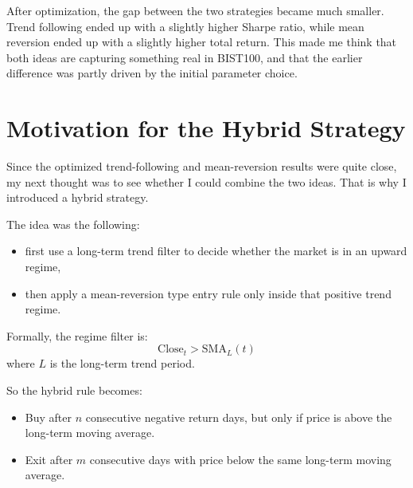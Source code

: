 \documentclass[11pt]{article}
\begin{document}
\begin{table}[H]
\centering
\caption{Optimized Trend Following and Mean Reversion}
\label{tab:optimized_classic}
\end{table}

After optimization, the gap between the two strategies became much smaller. Trend following ended up with a slightly higher Sharpe ratio, while mean reversion ended up with a slightly higher total return. This made me think that both ideas are capturing something real in BIST100, and that the earlier difference was partly driven by the initial parameter choice.

\section{Motivation for the Hybrid Strategy}
Since the optimized trend-following and mean-reversion results were quite close, my next thought was to see whether I could combine the two ideas. That is why I introduced a hybrid strategy.

The idea was the following:
\begin{itemize}
    \item first use a long-term trend filter to decide whether the market is in an upward regime,
    \item then apply a mean-reversion type entry rule only inside that positive trend regime.
\end{itemize}

Formally, the regime filter is:
\[
\text{Close}_t > \text{SMA}_{L}(t)
\]
where $L$ is the long-term trend period.

So the hybrid rule becomes:
\begin{itemize}
    \item Buy after $n$ consecutive negative return days, but only if price is above the long-term moving average.
    \item Exit after $m$ consecutive days with price below the same long-term moving average.
\end{itemize}
\end{document}
